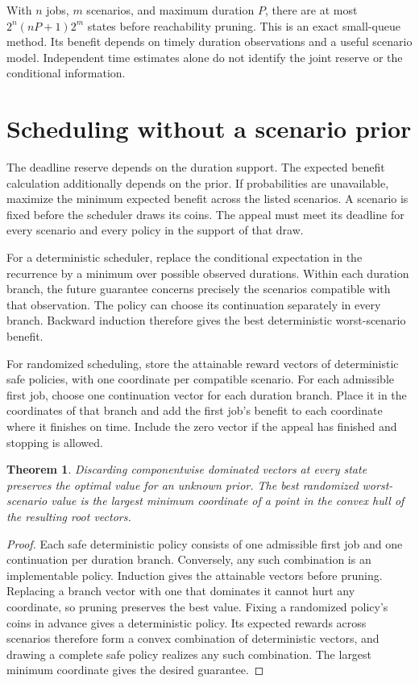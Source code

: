 \documentclass[11pt]{article}
\newtheorem{theorem}{Theorem}
\begin{document}
With $n$ jobs, $m$ scenarios, and maximum duration $P$, there
are at most $2^n(nP+1)2^m$ states before reachability pruning.
This is an exact small-queue method. Its benefit depends on
timely duration observations and a useful scenario model.
Independent time estimates alone do not identify the joint
reserve or the conditional information.

\section{Scheduling without a scenario prior}
The deadline reserve depends on the duration support. The
expected benefit calculation additionally depends on the prior.
If probabilities are unavailable, maximize the minimum expected
benefit across the listed scenarios. A scenario is fixed before
the scheduler draws its coins. The appeal must meet its deadline
for every scenario and every policy in the support of that draw.

For a deterministic scheduler, replace the conditional expectation
in the recurrence by a minimum over possible observed durations.
Within each duration branch, the future guarantee concerns precisely
the scenarios compatible with that observation. The policy can choose
its continuation separately in every branch. Backward induction
therefore gives the best deterministic worst-scenario benefit.

For randomized scheduling, store the attainable reward vectors of
deterministic safe policies, with one coordinate per compatible
scenario. For each admissible first job, choose one continuation
vector for each duration branch. Place it in the coordinates of
that branch and add the first job's benefit to each coordinate
where it finishes on time. Include the zero vector if the appeal
has finished and stopping is allowed.

\begin{theorem}
Discarding componentwise dominated vectors at every state preserves
the optimal value for an unknown prior. The best randomized
worst-scenario value is the largest minimum coordinate of a point
in the convex hull of the resulting root vectors.
\end{theorem}
\begin{proof}
Each safe deterministic policy consists of one admissible first
job and one continuation per duration branch. Conversely, any
such combination is an implementable policy. Induction gives
the attainable vectors before pruning. Replacing a branch vector
with one that dominates it cannot hurt any coordinate, so pruning
preserves the best value. Fixing a randomized policy's coins in
advance gives a deterministic policy. Its expected rewards across
scenarios therefore form a convex combination of deterministic
vectors, and drawing a complete safe policy realizes any such
combination. The largest minimum coordinate gives the desired
guarantee.
\end{proof}
\end{document}
